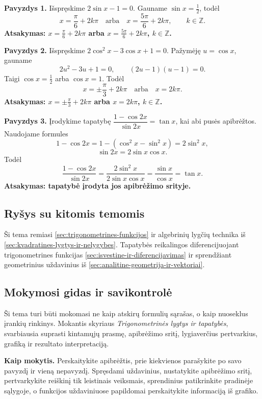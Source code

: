 \textbf{Pavyzdys 1.} Išspręskime $2\sin x-1=0$. Gauname $\sin x=\frac12$, todėl
\[
x=\frac{\pi}{6}+2k\pi \quad \text{arba}\quad x=\frac{5\pi}{6}+2k\pi,\qquad k\in\mathbb{Z}.
\]
\textbf{Atsakymas: $x=\frac{\pi}{6}+2k\pi$ arba $x=\frac{5\pi}{6}+2k\pi$, $k\in\mathbb{Z}$.}

\textbf{Pavyzdys 2.} Išspręskime $2\cos^2x-3\cos x+1=0$. Pažymėję $u=\cos x$, gauname
\[
2u^2-3u+1=0,\qquad (2u-1)(u-1)=0.
\]
Taigi $\cos x=\frac12$ arba $\cos x=1$. Todėl
\[
x=\pm\frac{\pi}{3}+2k\pi \quad \text{arba}\quad x=2k\pi.
\]
\textbf{Atsakymas: $x=\pm\frac{\pi}{3}+2k\pi$ arba $x=2k\pi$, $k\in\mathbb{Z}$.}

\textbf{Pavyzdys 3.} Įrodykime tapatybę $\dfrac{1-\cos 2x}{\sin 2x}=\tan x$, kai abi pusės apibrėžtos. Naudojame formules
\[
1-\cos 2x=1-(\cos^2x-\sin^2x)=2\sin^2x,
\]
\[
\sin 2x=2\sin x\cos x.
\]
Todėl
\[
\frac{1-\cos 2x}{\sin 2x}=\frac{2\sin^2x}{2\sin x\cos x}=\frac{\sin x}{\cos x}=\tan x.
\]
\textbf{Atsakymas: tapatybė įrodyta jos apibrėžimo srityje.}

\subsection{Ryšys su kitomis temomis}

Ši tema remiasi \ref{sec:trigonometrines-funkcijos} ir algebrinių lygčių technika iš \ref{sec:kvadratines-lygtys-ir-nelygybes}. Tapatybės reikalingos diferencijuojant trigonometrines funkcijas \ref{sec:isvestine-ir-diferencijavimas} ir sprendžiant geometrinius uždavinius iš \ref{sec:analitine-geometrija-ir-vektoriai}.

\subsection{Mokymosi gidas ir savikontrolė}

Ši tema turi būti mokomasi ne kaip atskirų formulių sąrašas, o kaip nuoseklus įrankių rinkinys. Mokantis skyriaus \textit{Trigonometrinės lygtys ir tapatybės}, svarbiausia suprasti kintamųjų prasmę, apibrėžimo sritį, lygiaverčius pertvarkius, grafiką ir rezultato interpretaciją.

\textbf{Kaip mokytis.} Perskaitykite apibrėžtis, prie kiekvienos parašykite po savo pavyzdį ir vieną nepavyzdį. Spręsdami uždavinius, nustatykite apibrėžimo sritį, pertvarkykite reiškinį tik leistinais veiksmais, sprendinius patikrinkite pradinėje sąlygoje, o funkcijos uždaviniuose papildomai perskaitykite informaciją iš grafiko.

